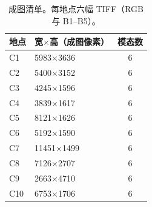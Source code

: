 \begin{table}[htbp]\centering\small
\caption{成图清单。每地点六幅 TIFF（RGB 与 B1--B5）。}
\label{tab:scene-inventory-zh}
\begin{tabular}{llc}\toprule
地点 & 宽$\times$高（成图像素） & 模态数\\\midrule
C1 & 5983$\times$3636 & 6\\
C2 & 5400$\times$3152 & 6\\
C3 & 4245$\times$1596 & 6\\
C4 & 3839$\times$1617 & 6\\
C5 & 8121$\times$1626 & 6\\
C6 & 5192$\times$1590 & 6\\
C7 & 11451$\times$1499 & 6\\
C8 & 7126$\times$2707 & 6\\
C9 & 2663$\times$4710 & 6\\
C10 & 6753$\times$1706 & 6\\\bottomrule\end{tabular}\end{table}